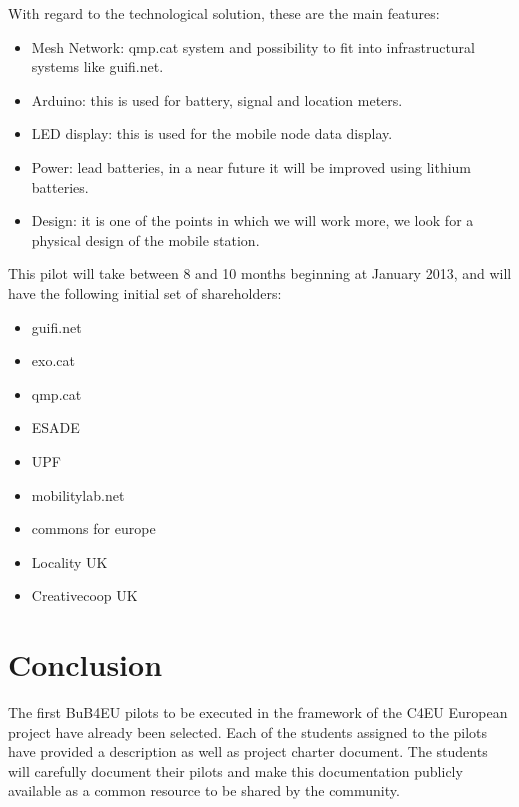 \documentclass[draftclsnofoot,12pt,journal,onecolumn]{IEEEtran}
\begin{document}
With regard to the technological solution, these are the main features:

\begin{itemize}
	\item Mesh Network: qmp.cat system and possibility to fit into infrastructural systems like guifi.net. 
	\item Arduino: this is used for battery, signal and location meters.
	\item LED display: this is used for the mobile node data display.
	\item Power: lead batteries, in a near future it will be improved using lithium batteries.
	\item Design: it is one of the points in which we will work more, we look for a physical design of the mobile station. \\
\end{itemize}

This pilot will take between 8 and 10 months beginning at January 2013, and will have the following initial set of shareholders:

			\begin{itemize}
				\item guifi.net
				\item exo.cat
				\item qmp.cat
				\item ESADE
				\item UPF
				\item mobilitylab.net
				\item commons for europe
				\item Locality UK
				\item Creativecoop UK
			\end{itemize}  




\section{Conclusion}
\label{sec:conclusion}

The first BuB4EU pilots to be executed in the framework of the C4EU European project have already been selected.
Each of the students assigned to the pilots have provided a description as well as project charter document.
The students will carefully document their pilots and make this documentation publicly available as a common resource to be shared by the community.




\end{document}
